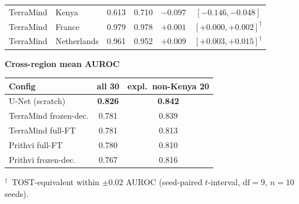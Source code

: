 \documentclass{article}
\begin{document}
\begin{table}[!htb]
\begin{minipage}[t]{0.59\linewidth}
\begin{tabular*}{\linewidth}{@{\extracolsep{\fill}}llcccc@{}}
TerraMind & Kenya & 0.613 & 0.710 & $-0.097$ & $[-0.146,-0.048]$ \\
TerraMind & France & 0.979 & 0.978 & $+0.001$ & $[+0.000,+0.002]^\dagger$ \\
TerraMind & Netherlands & 0.961 & 0.952 & $+0.009$ & $[+0.003,+0.015]^\dagger$ \\
\bottomrule
\end{tabular*}
\end{minipage}\hfill
\begin{minipage}[t]{0.38\linewidth}
\vspace{0pt}\centering\scriptsize
\textbf{Cross-region mean AUROC}\\[3pt]
\setlength{\tabcolsep}{2.5pt}
\begin{tabular*}{\linewidth}{@{\extracolsep{\fill}}lcc@{}}
\toprule
Config & all 30 & expl.\ non-Kenya 20 \\
\midrule
U-Net (scratch)    & \textbf{0.826} & \textbf{0.842} \\
TerraMind frozen-dec. & 0.781 & 0.839 \\
TerraMind full-FT  & 0.781 & 0.813 \\
Prithvi full-FT    & 0.780 & 0.810 \\
Prithvi frozen-dec. & 0.767 & 0.816 \\
\bottomrule
\end{tabular*}
\end{minipage}
\par\vspace{0.35em}
{\footnotesize $^\dagger$~TOST-equivalent within $\pm 0.02$ AUROC
(seed-paired $t$-interval, $\mathrm{df}=9$, $n{=}10$ seeds).}
\end{table}
\end{document}
